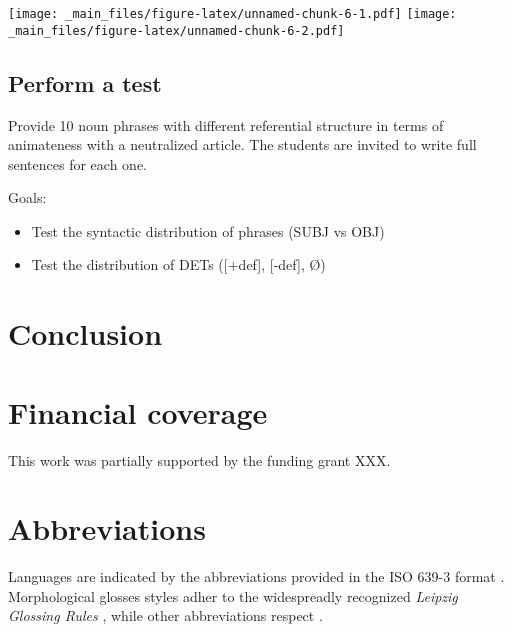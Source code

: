 \documentclass[a4paper,twoside,12pt,chapterprefix=false,listof=flat]{scrartcl}
\providecommand{\tightlist}{%
  \setlength{\itemsep}{0pt}\setlength{\parskip}{0pt}}
\theoremstyle{plain} %
\theoremstyle{definition}
\theoremstyle{remark}
\begin{document}
\texttt{[image: \_main\_files/figure-latex/unnamed-chunk-6-1.pdf]}
\texttt{[image: \_main\_files/figure-latex/unnamed-chunk-6-2.pdf]}

\subsection{Perform a test}\label{perform-a-test}

Provide 10 noun phrases with different referential structure in terms of
animateness with a neutralized article. The students are invited to
write full sentences for each one.

Goals:

\begin{itemize}
\tightlist
\item
  Test the syntactic distribution of phrases (SUBJ vs OBJ)
\item
  Test the distribution of DETs ({[}+def{]}, {[}-def{]}, Ø)
\end{itemize}

\section{Conclusion}\label{sec:concl}

\section*{Financial coverage}\label{financial-coverage}

This work was partially supported by the funding grant XXX.

\section*{Abbreviations}\label{abbreviations}

Languages are indicated by the abbreviations provided in the ISO 639-3
format \citep{iso639-3}. Morphological glosses styles adher to the
widespreadly recognized \emph{Leipzig Glossing Rules}
\citep{leipzigGlossingRules}, while other abbreviations respect
\citep{boeckxListOfAbbreviations}.


\end{document}
